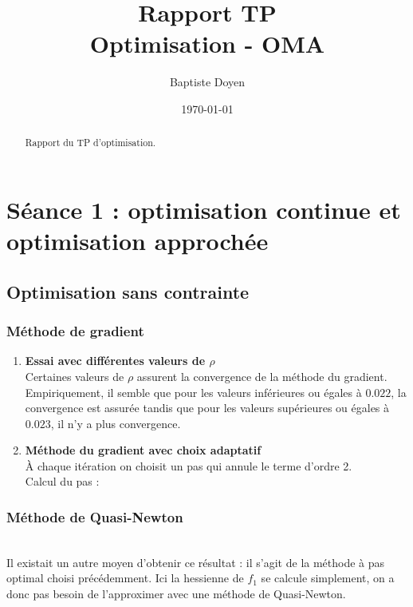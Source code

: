 \documentclass[a4paper]{article}
\title{Rapport TP 
\\Optimisation - OMA}
\author{Baptiste Doyen}
\date{\today}
\begin{document}
\maketitle

\begin{abstract}
Rapport du TP d'optimisation. 
\end{abstract}

\section{Séance 1 : optimisation continue et optimisation approchée}

\subsection{Optimisation sans contrainte}

\subsubsection{Méthode de gradient}

\begin{enumerate}
\item \textbf{Essai avec différentes valeurs de $\rho$}
\vspace{0.1cm}
\\ Certaines valeurs de $\rho$ assurent la convergence de la méthode du gradient. Empiriquement, il semble que pour les valeurs inférieures ou égales à $0.022$, la convergence est assurée tandis que pour les valeurs supérieures ou égales à $0.023$, il n'y a plus convergence.
\item \textbf{Méthode du gradient avec choix adaptatif}
\vspace{0.1cm}
\\ À chaque itération on choisit un pas qui annule le terme d'ordre 2.
\\ Calcul du pas :
\end{enumerate}

\subsubsection{Méthode de Quasi-Newton}

\\ Il existait un autre moyen d'obtenir ce résultat : il s'agit de la méthode à pas optimal choisi précédemment. Ici la hessienne de $f_1$ se calcule simplement, on a donc pas besoin de l'approximer avec une méthode de Quasi-Newton.
\end{document}
